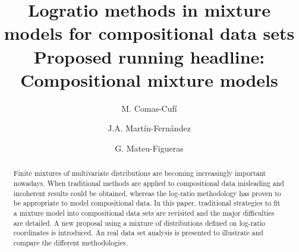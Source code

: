 \documentclass[12pt, a4paper]{article}
\title{Logratio methods in mixture models for compositional data sets \\ {\large Proposed running headline: Compositional mixture models} }
\author[1]{M. Comas-Cufí}%
\author[1]{J.A. Martín-Fernández}
\author[1]{G. Mateu-Figueras}
\affil[1]{\small Department of Computer Science, Applied Mathematics and Statistics, Universitat de Girona}
\theoremstyle{definition}
\begin{document}
\maketitle

\newpage



\providecommand{\keywords}[1]{\textbf{Keywords:} #1}
\providecommand{\msc}[1]{\textbf{MSC2010:} #1}

\begin{abstract}
Finite mixtures of multivariate distributions are becoming increasingly important nowadays. When traditional methods are applied to compositional data misleading and incoherent results could be obtained, whereas the log-ratio methodology has proven to be appropriate to model compositional data. In this paper, traditional strategies to fit a mixture model into compositional data sets are revisited and the major difficulties are detailed. A new proposal using a mixture of distributions defined on log-ratio coordinates is introduced. An real data set analysis is presented to illustrate and compare the different methodologies.

\end{abstract}
\end{document}
